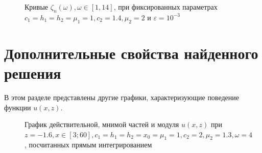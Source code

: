 \documentclass[a4paper, 12pt]{article}
\begin{document}
\begin{figure}[h!]
\noindent{}
\caption{Кривые $\zeta_n(\omega), \omega \in [1,14]$, при фиксированных параметрах $c_1=h_1=h_2=\mu_1=1,c_2=1.4,\mu_2=2$ и $\varepsilon = 10^{-3}$}
\label{figCurves} 
\end{figure}

\section{Дополнительные свойства найденного решения}
В этом разделе представлены другие графики, характеризующие поведение функции $u(x,z)$.

\begin{figure}[h!]
\noindent{}
\caption{График действительной, мнимой частей и модуля $u(x,z)$ при $z=-1.6, x \in [3;60], c_1=h_1=h_2=x_0=\mu_1=1, c_2=2,\mu_2=1.3,\omega=4$, посчитанных прямым интегрированием}
\label{figCurves}
\end{figure}
\end{document}
